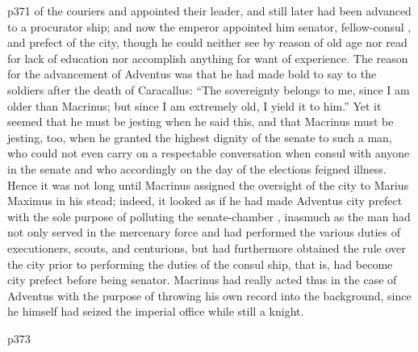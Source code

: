p371 of the couriers and appointed their leader, and still later had been advanced to a procurator ­ship; and now the emperor appointed him senator, fellow-consul , and prefect of the city, though he could neither see by reason of old age nor read for lack of education nor accomplish anything for want of experience. The reason for the advancement of Adventus was that he had made bold to say to the soldiers after the death of Caracallus: ``The sovereignty belongs to me, since I am older than Macrinus; but since I am extremely old, I yield it to him.'' Yet it seemed that he must be jesting when he said this, and that Macrinus must be jesting, too, when he granted the highest dignity of the senate to such a man, who could not even carry on a respectable conversation when consul with anyone in the senate and who accordingly on the day of the elections feigned illness. Hence it was not long until Macrinus assigned the oversight of the city to Marius Maximus in his stead; indeed, it looked as if he had made Adventus city prefect with the sole purpose of polluting the senate-chamber , inasmuch as the man had not only served in the mercenary force and had performed the various duties of executioners, scouts, and centurions, but had furthermore obtained the rule over the city prior to performing the duties of the consul ­ship, that is, had become city prefect before being senator. Macrinus had really acted thus in the case of Adventus with the purpose of throwing his own record into the background, since he himself had seized the imperial office while still a knight.

p373

